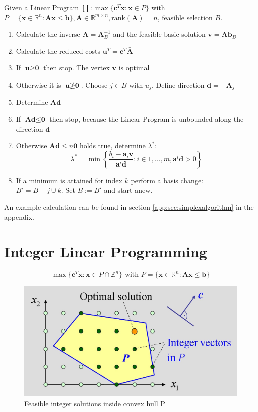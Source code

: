 \documentclass[11pt]{article}
\begin{document}
Given a Linear Program $\prod: \max\{ \textbf{c}^T\textbf{x}:\textbf{x} \in P \}$ with  $P=\{ \textbf{x}\in\mathbb{R}^n:\textbf{A}\textbf{x}\leq\textbf{b}\}, \textbf{A}\in\mathbb{R}^{m\times n}, \text{rank}(\textbf{A})=n$, feasible selection $B$.
\begin{enumerate}[label=\roman*)]
	\item Calculate the inverse $\bar{\textbf{A}}=\textbf{A}_B^{-1}$ and the feasible basic solution $\textbf{v} = \bar{\textbf{A}}\textbf{b}_B$
	\item Calculate the reduced costs $\textbf{u}^T = \textbf{c}^T \bar{\textbf{A}}$
	\item If $\textbf{u}\geq \textbf{0}$ then stop. The vertex $\textbf{v}$ is optimal
	\item Otherwise it is $\textbf{u}\ngeq\textbf{0}$. Choose $j\in B$ with $u_j$. Define direction $\textbf{d}=-\bar{\textbf{A}}_j$
	\item Determine $\textbf{A}\textbf{d}$
	\item If $\textbf{A}\textbf{d}\leq \textbf{0}$ then stop, because the Linear Program is unbounded along the direction $\textbf{d}$
	\item Otherwise $\textbf{A}\textbf{d}\leq n\textbf{0}$ holds true, determine $\lambda^*$:
	\begin{equation*}
		\lambda^* = \min\left\{ \frac{b_i - \textbf{a}_i \textbf{v}}{\textbf{a}^i\textbf{d}} : i\in 1,...,m , \textbf{a}^i\textbf{d}>0 \right\}
	\end{equation*}
	\item If a minimum is attained for index $k$ perform a basis change:\\
	$B' = B - {j}\cup{k}$. Set $B:=B'$ and start anew.
\end{enumerate}

An example calculation can be found in section \ref{app:sec:simplexalgorithm} in the appendix.

\section{Integer Linear Programming}
\begin{equation*}
	\max\{\textbf{c}^T \textbf{x} : \textbf{x} \in P \cap \mathbb{Z}^n \}\text{ with }P = \{\textbf{x} \in \mathbb{R}^n : \textbf{A}\textbf{x} \leq \textbf{b}\}
\end{equation*}

\begin{figure}[H]
	\centering
	\includegraphics[width=0.7\linewidth]{img/linear_integer_programming}
	\caption{Feasible integer solutions inside convex hull P}
	\label{fig:linearintegerprogramming}
\end{figure}
\end{document}
